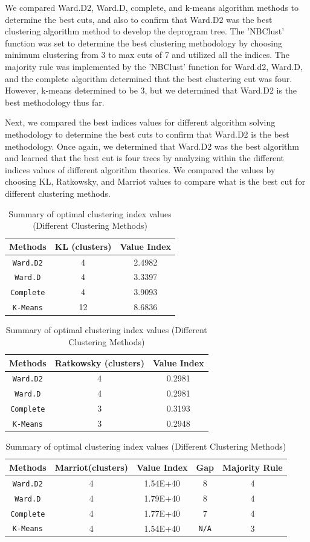 \documentclass[10pt,twoside]{article}
\numberwithin{equation}{section}
\newcommand{\?}{\stackrel{?}{=}}
\begin{document}
We compared Ward.D2, Ward.D, complete, and k-means algorithm methods to determine the best cuts, and also to confirm that Ward.D2 was the best clustering algorithm method to develop the deprogram tree. The 'NBClust' function was set to determine the best clustering methodology by choosing minimum clustering from 3 to max cuts of 7 and utilized all the indices.  The majority rule was implemented by the 'NBClust' function for Ward.d2, Ward.D, and the complete algorithm determined that the best clustering cut was four. However, k-means determined to be 3, but we determined that Ward.D2 is the best methodology thus far. 

Next, we compared the best indices values for different algorithm solving methodology to determine the best cuts to confirm that Ward.D2 is the best methodology. Once again, we determined that Ward.D2 was the best algorithm and learned that the best cut is four trees by analyzing within the different indices values of different algorithm theories. We compared the values by choosing KL, Ratkowsky, and Marriot values to compare what is the best cut for different clustering methods. 

\begin{table}[h!]
  \centering
  \begin{tabular}{c c c}\toprule
    \bf Methods & \bf KL (clusters) & \bf Value Index \\\midrule
    \texttt{Ward.D2} & 4 & 2.4982 \\\hline
    \texttt{Ward.D} & 4 & 3.3397 \\\hline
    \texttt{Complete} & 4 & 3.9093 \\\hline
     \texttt{K-Means} & 12 & 8.6836  \\\bottomrule
  \end{tabular}
   \centering
  \begin{tabular}{c c c}\toprule
    \bf Methods & \bf Ratkowsky (clusters) & \bf Value Index \\\midrule
    \texttt{Ward.D2} & 4 & 0.2981 \\\hline
    \texttt{Ward.D} & 4 & 0.2981 \\\hline
    \texttt{Complete} & 3 & 0.3193 \\\hline
     \texttt{K-Means} & 3 & 0.2948 \\\bottomrule
  \end{tabular}
   \centering
  \begin{tabular}{c c c c c}\toprule
    \bf Methods & \bf Marriot(clusters) & \bf Value Index & \bf Gap & \bf Majority Rule  \\\midrule
    \texttt{Ward.D2} & 4 & 1.54E+40 &  8 & 4 \\\hline
    \texttt{Ward.D} & 4 & 1.79E+40 & 8 & 4 \\\hline
    \texttt{Complete} & 4 & 1.77E+40  & 7 & 4 \\\hline
     \texttt{K-Means} & 4 & 1.54E+40  & \texttt{N/A} & 3  \\\bottomrule
  \end{tabular}
  \caption{Summary of optimal clustering index values (Different Clustering Methods)}
  \label{tab:summary}
\end{table}
\end{document}
